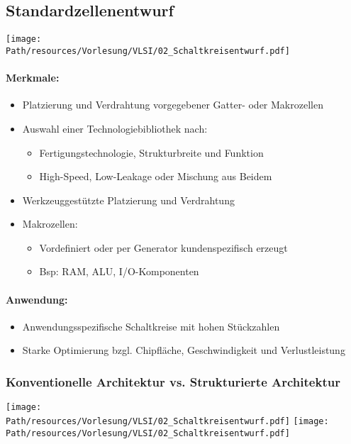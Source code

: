 \newpage
\subsection{Standardzellenentwurf}
	\begin{center}
		\texttt{[image: \\Path/resources/Vorlesung/VLSI/02\_Schaltkreisentwurf.pdf]}
	\end{center}
	\paragraph{Merkmale:}
	\begin{itemize}
		\item Platzierung und Verdrahtung vorgegebener Gatter- oder Makrozellen
		\item Auswahl einer Technologiebibliothek nach:
			\begin{itemize}
				\item Fertigungstechnologie, Strukturbreite und Funktion
				\item High-Speed, Low-Leakage oder Mischung aus Beidem
			\end{itemize}
		\item Werkzeuggestützte Platzierung und Verdrahtung
		\item Makrozellen:
			\begin{itemize}
				\item Vordefiniert oder per Generator kundenspezifisch erzeugt
				\item Bsp: RAM, ALU, I/O-Komponenten
			\end{itemize}
	\end{itemize}
	\paragraph{Anwendung:}
	\begin{itemize}
		\item Anwendungsspezifische Schaltkreise mit hohen Stückzahlen
		\item Starke Optimierung bzgl. Chipfläche, Geschwindigkeit und Verlustleistung
	\end{itemize}
	\subsubsection{Konventionelle Architektur vs. Strukturierte Architektur}
		\begin{center}
			\texttt{[image: \\Path/resources/Vorlesung/VLSI/02\_Schaltkreisentwurf.pdf]}
			\texttt{[image: \\Path/resources/Vorlesung/VLSI/02\_Schaltkreisentwurf.pdf]}
		\end{center}
	
